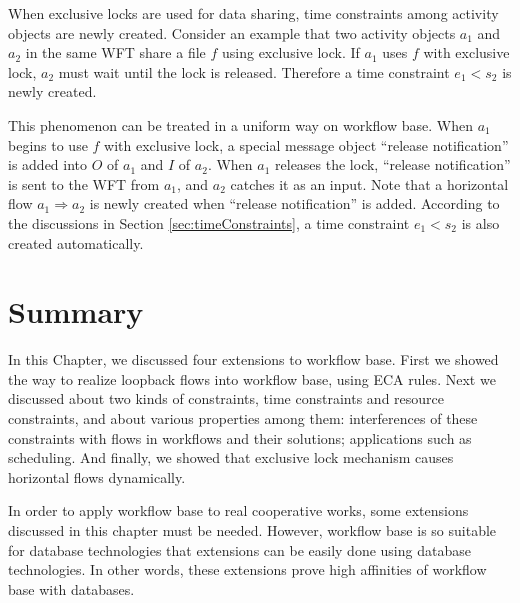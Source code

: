 When exclusive locks are used for data sharing, time constraints among
activity objects are newly created.  Consider an example that two
activity objects $a_1$ and $a_2$ in the same WFT share a file $f$ using
exclusive lock.  If $a_1$ uses $f$ with exclusive lock, $a_2$ must wait
until the lock is released.  Therefore a time constraint $e_1 < s_2$ is
newly created.

This phenomenon can be treated in a uniform way on workflow base.  When
$a_1$ begins to use $f$ with exclusive lock, a special message object
``release notification'' is added into $O$ of $a_1$ and $I$ of $a_2$.
When $a_1$ releases the lock, ``release notification'' is sent to the
WFT from $a_1$, and $a_2$ catches it as an input.  Note that a
horizontal flow $a_1 \Longrightarrow a_2$ is newly created when
``release notification'' is added.  According to the discussions in
Section \ref{sec:timeConstraints}, a time constraint $e_1 < s_2$ is also 
created automatically.

\section{Summary}
\label{sec:ext:conclu}

In this Chapter, we discussed four extensions to workflow base.  First
we showed the way to realize loopback flows into workflow base, using
ECA rules.  Next we discussed about two kinds of constraints, time
constraints and resource constraints, and about various properties among
them: interferences of these constraints with flows in workflows and
their solutions; applications such as scheduling.  And finally, we showed
that exclusive lock mechanism causes horizontal flows dynamically.

In order to apply workflow base to real cooperative works, some
extensions discussed in this chapter must be needed.  However, workflow
base is so suitable for database technologies that extensions can be
easily done using database technologies.  In other words, these
extensions prove high affinities of workflow base with databases.
